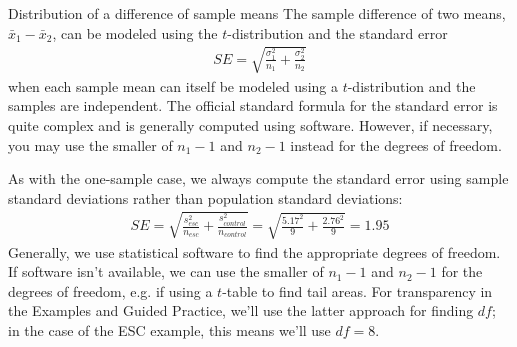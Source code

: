 \begin{onebox}{Distribution of a difference of sample means}
  The sample difference of two means, $\bar{x}_1 - \bar{x}_2$,
  can be modeled using the $t$-distribution and the standard error
  \begin{align*}
  SE%
    = \sqrt{\frac{\sigma_1^2}{n_1} + \frac{\sigma_2^2}{n_2}}
  \end{align*}
  when each sample mean can itself be modeled using
  a $t$-distribution and the samples are independent.
  The official standard formula for the standard error is quite
  complex and is generally computed using software.
  However, if necessary, you may use the smaller of
  $n_1 - 1$ and $n_2 - 1$ instead for the degrees of freedom.
\end{onebox}


As with the one-sample case, we always compute the
standard error using sample standard deviations rather
than population standard deviations:
\begin{align*}
SE%
	= \sqrt{\frac{s_{esc}^2}{n_{esc}} + \frac{s_{control}^2}{n_{control}}}
	= \sqrt{\frac{5.17^2}{9} + \frac{2.76^2}{9}} = 1.95
\end{align*}
Generally, we use statistical software to find the appropriate
degrees of freedom. %
If software isn't available, we can use the smaller
of $n_1 - 1$ and $n_2 - 1$ for the degrees of freedom,
e.g. if using a $t$-table to find tail areas.
For transparency in the Examples and Guided Practice,
we'll use the latter approach for finding $df$;
in the case of the ESC example, this means we'll use $df = 8$.


